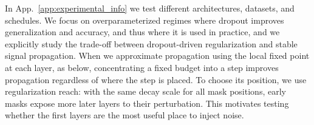 In App.~\ref{app:experimental_info} we test different architectures, datasets, and schedules. We focus on overparameterized regimes where dropout improves generalization and accuracy, and thus where it is used in practice, and we explicitly study the trade-off between dropout-driven regularization and stable signal propagation. When we approximate propagation using the local fixed point at each layer, as below, concentrating a fixed budget into a step improves propagation regardless of where the step is placed. To choose its position, we use regularization reach: with the same decay scale for all mask positions, early masks expose more later layers to their perturbation. This motivates testing whether the first layers are the most useful place to inject noise.
